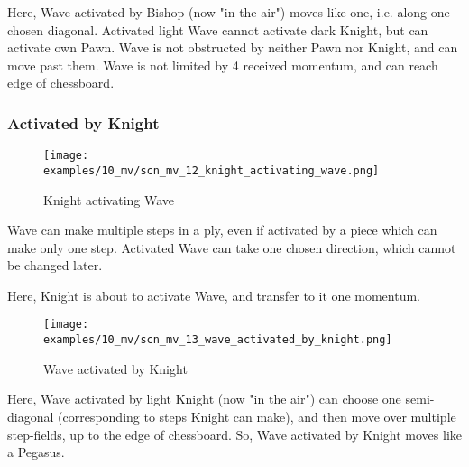 Here, Wave activated by Bishop (now "in the air") moves like one, i.e. along one chosen
diagonal. Activated light Wave cannot activate dark Knight, but can activate own Pawn.
Wave is not obstructed by neither Pawn nor Knight, and can move past them. Wave is not
limited by 4 received momentum, and can reach edge of chessboard.

\clearpage %

\subsubsection*{Activated by Knight}
\label{sec:Miranda's veil/Wave/Movement/Activated by Knight}

\vspace*{-1.4\baselineskip}
\noindent
\begin{figure}[h]
\texttt{[image: examples/10\_mv/scn\_mv\_12\_knight\_activating\_wave.png]}
\caption{Knight activating Wave}
\label{fig:scn_mv_12_knight_activating_wave}
\end{figure}

Wave can make multiple steps in a ply, even if activated by a piece which can make only
one step. Activated Wave can take one chosen direction, which cannot be changed later.

Here, Knight is about to activate Wave, and transfer to it one momentum.

\clearpage %

\vspace*{-2.1\baselineskip}
\noindent
\begin{figure}[!h]
\texttt{[image: examples/10\_mv/scn\_mv\_13\_wave\_activated\_by\_knight.png]}
\caption{Wave activated by Knight}
\label{fig:scn_mv_13_wave_activated_by_knight}
\end{figure}

Here, Wave activated by light Knight (now "in the air") can choose one semi-diagonal
(corresponding to steps Knight can make), and then move over multiple step-fields, up
to the edge of chessboard. So, Wave activated by Knight moves like a Pegasus.

\clearpage %

